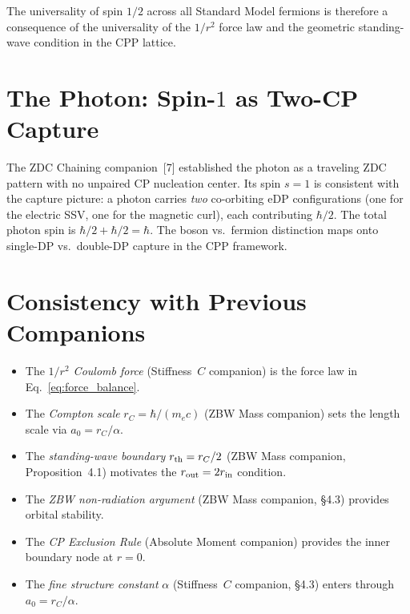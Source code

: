 \documentclass[12pt]{article}
\newcommand{\rC}{r_C}
\newcommand{\rin}{r_{\rm in}}
\newcommand{\rout}{r_{\rm out}}
\newcommand{\aBohr}{a_0}
\begin{document}
The universality of spin $1/2$ across all Standard Model fermions
is therefore a consequence of the universality of the $1/r^2$ force
law and the geometric standing-wave condition in the CPP lattice.

\section{The Photon: Spin-$1$ as Two-CP Capture}
\label{sec:photon_spin}

The ZDC Chaining companion~[7] established the photon as a traveling
ZDC pattern with no unpaired CP nucleation center.  Its spin $s = 1$
is consistent with the capture picture: a photon carries \emph{two}
co-orbiting eDP configurations (one for the electric SSV, one for the
magnetic curl), each contributing $\hbar/2$.  The total photon spin
is $\hbar/2 + \hbar/2 = \hbar$.  The boson vs.\ fermion distinction
maps onto single-DP vs.\ double-DP capture in the CPP framework.

\section{Consistency with Previous Companions}
\label{sec:consistency}

\begin{itemize}[noitemsep]
  \item The \emph{$1/r^2$ Coulomb force} (Stiffness~$C$ companion)
    is the force law in Eq.~\eqref{eq:force_balance}.
  \item The \emph{Compton scale} $\rC = \hbar/(m_e c)$ (ZBW Mass
    companion) sets the length scale via $\aBohr = \rC/\alpha$.
  \item The \emph{standing-wave boundary} $r_{\rm th} = \rC/2$ (ZBW
    Mass companion, Proposition~4.1) motivates the $\rout = 2\rin$
    condition.
  \item The \emph{ZBW non-radiation argument} (ZBW Mass companion,
    \S4.3) provides orbital stability.
  \item The \emph{CP Exclusion Rule} (Absolute Moment companion)
    provides the inner boundary node at $r = 0$.
  \item The \emph{fine structure constant} $\alpha$ (Stiffness~$C$
    companion, \S4.3) enters through $\aBohr = \rC/\alpha$.
\end{itemize}
\end{document}
